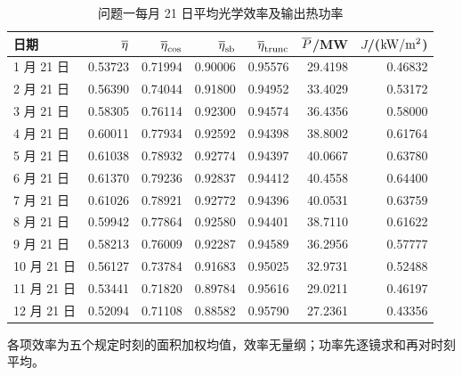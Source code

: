 \begin{table}[H]
\centering\small
\caption{问题一每月 21 日平均光学效率及输出热功率}\label{tab:q1month}
\begin{tabular}{lrrrrrr}
\toprule
日期 & $\overline{\eta}$ & $\overline{\eta}_{\rm cos}$ & $\overline{\eta}_{\rm sb}$ & $\overline{\eta}_{\rm trunc}$ & $\overline{P}$/MW & $J$/($\mathrm{kW}/\mathrm{m}^{2}$)\\\midrule
1 月 21 日 & 0.53723 & 0.71994 & 0.90006 & 0.95576 & 29.4198 & 0.46832\\
2 月 21 日 & 0.56390 & 0.74044 & 0.91800 & 0.94952 & 33.4029 & 0.53172\\
3 月 21 日 & 0.58305 & 0.76114 & 0.92300 & 0.94574 & 36.4356 & 0.58000\\
4 月 21 日 & 0.60011 & 0.77934 & 0.92592 & 0.94398 & 38.8002 & 0.61764\\
5 月 21 日 & 0.61038 & 0.78932 & 0.92774 & 0.94397 & 40.0667 & 0.63780\\
6 月 21 日 & 0.61370 & 0.79236 & 0.92837 & 0.94412 & 40.4558 & 0.64400\\
7 月 21 日 & 0.61026 & 0.78921 & 0.92772 & 0.94396 & 40.0531 & 0.63759\\
8 月 21 日 & 0.59942 & 0.77864 & 0.92580 & 0.94401 & 38.7110 & 0.61622\\
9 月 21 日 & 0.58213 & 0.76009 & 0.92287 & 0.94589 & 36.2956 & 0.57777\\
10 月 21 日 & 0.56127 & 0.73784 & 0.91683 & 0.95025 & 32.9731 & 0.52488\\
11 月 21 日 & 0.53441 & 0.71820 & 0.89784 & 0.95616 & 29.0211 & 0.46197\\
12 月 21 日 & 0.52094 & 0.71108 & 0.88582 & 0.95790 & 27.2361 & 0.43356\\
\bottomrule
\end{tabular}
\par\vspace{3pt}\begin{minipage}{.95\linewidth}\footnotesize 各项效率为五个规定时刻的面积加权均值，效率无量纲；功率先逐镜求和再对时刻平均。\end{minipage}
\end{table}
